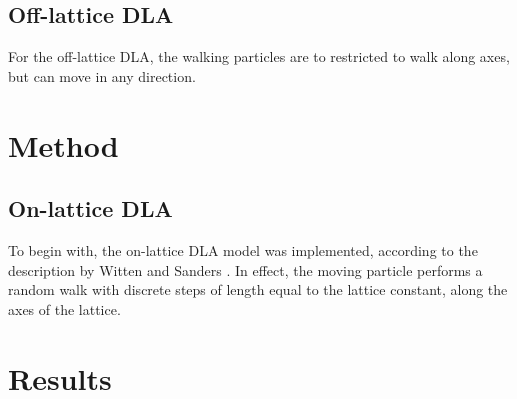 \documentclass{article}
\begin{document}
\subsection{Off-lattice DLA}
For the off-lattice DLA, the walking particles are to restricted to walk along axes, but can move in any direction. 

\section {Method}
\subsection{On-lattice DLA}
To begin with, the on-lattice DLA model was implemented, according to the description by Witten and Sanders \cite{witten_and_sanders81}. In effect, the moving particle performs a random walk with discrete steps of length equal to the lattice constant, along the axes of the lattice. 

\section{Results}

\begin{lstlisting}
\end{lstlisting}




{}

\end{document}
